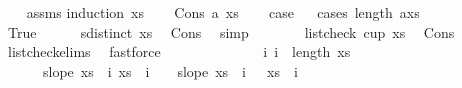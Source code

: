 \begin{isabellebody}
%
\isadelimproof
\ \ %
\endisadelimproof
%
\isatagproof
{}\isamarkupfalse%
\ assms\isanewline
{}\isamarkupfalse%
{\isacharparenleft}{\kern0pt}induction\ xs{\isacharparenright}{\kern0pt}\isanewline
\ \ \isamarkupfalse%
\ {\isacharparenleft}{\kern0pt}Cons\ a\ xs{\isacharparenright}{\kern0pt}\isanewline
\ \ \isamarkupfalse%
\ {\isacharquery}{\kern0pt}case\isanewline
\ \ \isamarkupfalse%
{\isacharparenleft}{\kern0pt}cases\ {\isachardoublequoteopen}length\ {\isacharparenleft}{\kern0pt}a{\isacharhash}{\kern0pt}xs{\isacharparenright}{\kern0pt}\ {\isasymge}\ {}{\isachardoublequoteclose}{\isacharparenright}{\kern0pt}\isanewline
\ \ \ \ \isamarkupfalse%
\ True\isanewline
\ \ \ \ \isamarkupfalse%
\ {\isachardoublequoteopen}sdistinct\ xs{\isachardoublequoteclose}\ \isamarkupfalse%
\ Cons{\isacharparenleft}{\kern0pt}{}{\isacharparenright}{\kern0pt}\ \isamarkupfalse%
\ simp\isanewline
\ \ \ \ \isamarkupfalse%
\ \isamarkupfalse%
\ {\isachardoublequoteopen}list{\isacharunderscore}{\kern0pt}check\ cup{}\ xs{\isachardoublequoteclose}\ \isamarkupfalse%
\ Cons{\isacharparenleft}{\kern0pt}{}{\isacharparenright}{\kern0pt}\isanewline
\ \ \ \ \ \ \isamarkupfalse%
\ list{\isacharunderscore}{\kern0pt}check{\isachardot}{\kern0pt}elims{\isacharparenleft}{\kern0pt}{}{\isacharparenright}{\kern0pt}\ \isamarkupfalse%
\ fastforce\isanewline
\ \ \ \ \isamarkupfalse%
\ \isamarkupfalse%
\ \isanewline
\ \ \ \ \ \ {\isachardoublequoteopen}{\isasymAnd}i{\isachardot}{\kern0pt}\ i\ {\isacharless}{\kern0pt}\ length\ xs\ {\isacharminus}{\kern0pt}\ {}\ {\isasymlongrightarrow}\ \isanewline
\ \ \ \ \ \ slope\ {\isacharparenleft}{\kern0pt}xs\ {\isacharbang}{\kern0pt}\ i{\isacharparenright}{\kern0pt}\ {\isacharparenleft}{\kern0pt}xs\ {\isacharbang}{\kern0pt}\ {\isacharparenleft}{\kern0pt}i\ {\isacharplus}{\kern0pt}\ {}{\isacharparenright}{\kern0pt}{\isacharparenright}{\kern0pt}\ {\isacharless}{\kern0pt}\ slope\ {\isacharparenleft}{\kern0pt}xs\ {\isacharbang}{\kern0pt}\ {\isacharparenleft}{\kern0pt}i\ {\isacharplus}{\kern0pt}\ {}{\isacharparenright}{\kern0pt}{\isacharparenright}{\kern0pt}\ {\isacharparenleft}{\kern0pt}xs\ {\isacharbang}{\kern0pt}\ {\isacharparenleft}{\kern0pt}i\ {\isacharplus}{\kern0pt}\ {}{\isacharparenright}{\kern0pt}{\isacharparenright}{\kern0pt}{\isachardoublequoteclose}\ \isanewline

\end{isabellebody}
